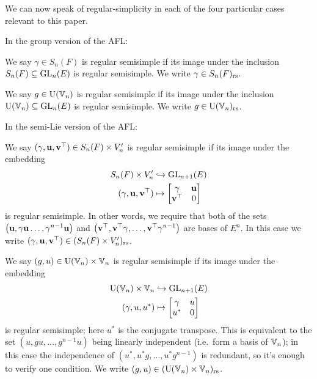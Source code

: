 We can now speak of regular-simplicity in each of the four
particular cases relevant to this paper.
\begin{definition}
  In the group version of the AFL:
  \begin{itemize}
    \ii We say $\gamma \in S_n(F)$ is regular semisimple
    if its image under the inclusion $S_n(F) \subseteq \operatorname{GL}_n(E)$ is regular semisimple.
    We write $\gamma \in S_n(F)_{\mathrm{rs}}$.

    \ii We say $g \in \operatorname{U}(\mathbb V_n)$ is regular semisimple
    if its image under the inclusion $\operatorname{U}(\mathbb V_n) \subseteq \operatorname{GL}_n(E)$ is regular semisimple.
    We write $g \in \operatorname{U}(\mathbb V_n)_{\mathrm{rs}}$.
  \end{itemize}
  In the semi-Lie version of the AFL:
  \begin{itemize}
    \ii We say $(\gamma, \mathbf u, \mathbf v^\top) \in S_n(F) \times V_n'$
    is regular semisimple if its image under the embedding
    \begin{equation}
      \begin{aligned}
        S_n(F) \times V_n' &\hookrightarrow \operatorname{GL}_{n+1}(E) \\
        (\gamma, \mathbf u, \mathbf v^\top) &\mapsto \begin{bmatrix} \gamma & \mathbf u \\ \mathbf v^\top & 0 \end{bmatrix}
      \end{aligned}
      \label{eq:embed_FJ_analytic}
    \end{equation}
    is regular semisimple.
    In other words, we require that
    both of the sets
    $\left( \mathbf u, \gamma \mathbf u \dots, \gamma^{n-1}\mathbf u \right)$
    and
    $\left( \mathbf v^\top, \mathbf v^\top \gamma, \dots, \mathbf v^\top \gamma^{n-1} \right)$
    are bases of $E^n$.
    In this case we write $(\gamma, \mathbf u, \mathbf v^\top) \in (S_n(F) \times V_n')_{\mathrm{rs}}$.

    \ii We say $(g, u) \in \operatorname{U}(\mathbb V_n) \times \mathbb V_n$
    is regular semisimple if its image under the embedding
    \begin{equation}
      \begin{aligned}
        \operatorname{U}(\mathbb V_n) \times \mathbb V_n &\hookrightarrow \operatorname{GL}_{n+1}(E) \\
        (\gamma, u, u^\ast) &\mapsto \begin{bmatrix} \gamma & u \\ u^\ast & 0 \end{bmatrix}
      \end{aligned}
      \label{eq:embed_FJ_geometric}
    \end{equation}
    is regular semisimple; here $u^\ast$ is the conjugate transpose.
    This is equivalent to the set $\left(  u, gu, \dots, g^{n-1}u \right)$
    being linearly independent (i.e.\ form a basis of $\mathbb V_n$);
    in this case the independence of $\left( u^\ast, u^\ast g, \dots, u^\ast g^{n-1} \right)$
    is redundant, so it's enough to verify one condition.
    We write $(g,u) \in (\operatorname{U}(\mathbb V_n) \times \mathbb V_n)_{\mathrm{rs}}$.
  \end{itemize}
  \label{def:regular}
\end{definition}

